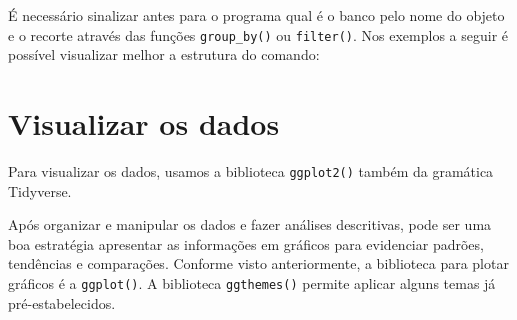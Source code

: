 \documentclass[
  brazil,
]{book}
\newenvironment{Shaded}{\begin{snugshade}}{\end{snugshade}}
\newcommand{\CommentTok}[1]{\textcolor[rgb]{0.56,0.35,0.01}{\textit{#1}}}
\newcommand{\DataTypeTok}[1]{\textcolor[rgb]{0.13,0.29,0.53}{#1}}
\newcommand{\DecValTok}[1]{\textcolor[rgb]{0.00,0.00,0.81}{#1}}
\newcommand{\KeywordTok}[1]{\textcolor[rgb]{0.13,0.29,0.53}{\textbf{#1}}}
\newcommand{\NormalTok}[1]{#1}
\newcommand{\OperatorTok}[1]{\textcolor[rgb]{0.81,0.36,0.00}{\textbf{#1}}}
\newcommand{\StringTok}[1]{\textcolor[rgb]{0.31,0.60,0.02}{#1}}
\begin{document}
É necessário sinalizar antes para o programa qual é o banco pelo nome do objeto e o recorte através das funções \texttt{group\_by()} ou \texttt{filter()}. Nos exemplos a seguir é possível visualizar melhor a estrutura do comando:

\begin{Shaded}
\end{Shaded}

\hypertarget{visualizar-os-dados}{%
\chapter{Visualizar os dados}\label{visualizar-os-dados}}

Para visualizar os dados, usamos a biblioteca \texttt{ggplot2()} também da gramática Tidyverse.

Após organizar e manipular os dados e fazer análises descritivas, pode ser uma boa estratégia apresentar as informações em gráficos para evidenciar padrões, tendências e comparações. Conforme visto anteriormente, a biblioteca para plotar gráficos é a \texttt{ggplot()}. A biblioteca \texttt{ggthemes()} permite aplicar alguns temas já pré-estabelecidos.
\end{document}
